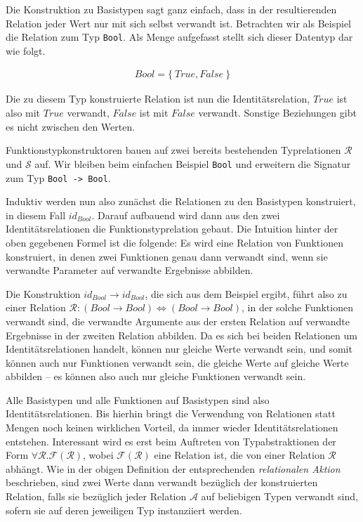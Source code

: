 
Die Konstruktion zu Basistypen sagt ganz einfach, dass in der resultierenden Relation jeder Wert nur mit sich selbst verwandt ist.
Betrachten wir als Beispiel die Relation zum Typ \texttt{Bool}. Als Menge aufgefasst stellt sich dieser Datentyp dar wie folgt.

\begin{align*}
Bool = \{~True, False~\}
\end{align*}

Die zu diesem Typ konstruierte Relation ist nun die Identitätsrelation, $True$ ist also mit $True$ verwandt, $False$ ist mit $False$ verwandt.
Sonstige Beziehungen gibt es nicht zwischen den Werten.

Funktionstypkonstruktoren bauen auf zwei bereits bestehenden Typrelationen $\mathcal{R}$ und $\mathcal{S}$ auf. Wir bleiben beim einfachen
Beispiel \texttt{Bool} und erweitern die Signatur zum Typ \texttt{Bool -> Bool}.

Induktiv werden nun also zunächst die Relationen zu den Basistypen konstruiert, in diesem Fall $id_{Bool}$. Darauf aufbauend
wird dann aus den zwei Identitätsrelationen die Funktionstyprelation gebaut. Die Intuition hinter der oben gegebenen Formel ist
die folgende: Es wird eine Relation von Funktionen konstruiert, in denen zwei Funktionen genau dann verwandt sind, wenn sie
verwandte Parameter auf verwandte Ergebnisse abbilden.

Die Konstruktion $id_{Bool} \rightarrow id_{Bool}$, die sich aus dem Beispiel ergibt, führt also zu einer Relation
$\mathcal{R} : (Bool \rightarrow Bool) \Leftrightarrow (Bool \rightarrow Bool)$, in der solche Funktionen verwandt sind,
die verwandte Argumente aus der ersten Relation auf verwandte Ergebnisse in der zweiten Relation abbilden. Da es sich bei
beiden Relationen um Identitätsrelationen handelt, können nur gleiche Werte verwandt sein, und somit können auch nur
Funktionen verwandt sein, die gleiche Werte auf gleiche Werte abbilden -- es können also auch nur gleiche Funktionen verwandt
sein.

Alle Basistypen und alle Funktionen auf Basistypen sind also Identitätsrelationen. Bis hierhin bringt die Verwendung von Relationen
statt Mengen noch keinen
wirklichen Vorteil, da immer wieder Identitätsrelationen entstehen. Interessant wird es erst beim Auftreten von Typabstraktionen der
Form
$\forall \mathcal{R} . \mathcal{F}(\mathcal{R})$, wobei $\mathcal{F}(\mathcal{R})$ eine Relation ist, die von einer Relation
$\mathcal{R}$ abhängt. Wie in der obigen Definition der entsprechenden \textit{relationalen Aktion} beschrieben, sind zwei Werte dann verwandt bezüglich der
konstruierten Relation, falls sie bezüglich jeder Relation $\mathcal{A}$ auf beliebigen Typen verwandt sind, sofern sie auf deren
jeweiligen Typ instanziiert werden.

